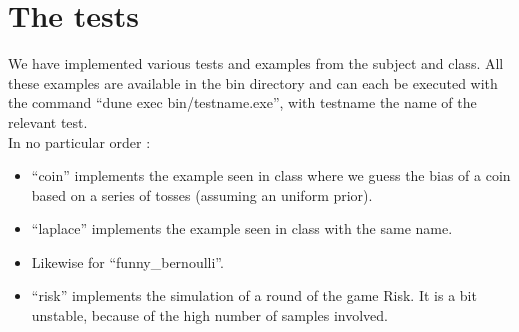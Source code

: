 \documentclass{article}
\begin{document}
\section{The tests}

We have implemented various tests and examples from the subject and class.
All these examples are available in the bin directory and can each be executed with the command ``dune exec bin/testname.exe'', with testname the name of the relevant test. \\

In no particular order :

\begin{itemize}
	\item ``coin'' implements the example seen in class where we guess the bias of a coin based on a series of tosses (assuming an uniform prior).
	\item ``laplace'' implements the example seen in class with the same name.
	\item Likewise for ``funny\_bernoulli''.
	\item ``risk'' implements the simulation of a round of the game Risk.
	      It is a bit unstable, because of the high number of samples involved.
\end{itemize}
\end{document}
